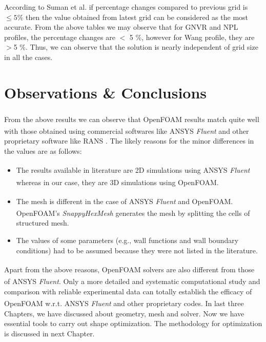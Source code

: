 According to Suman et al. \cite{suman} if percentage changes compared to previous grid is $\le 5 \%$ then the value obtained from latest grid can be considered as the most accurate. From the above tables we may observe that for GNVR and NPL profiles, the percentage changes are $<$  5 \%, however for Wang profile, they are $>$5 \%. Thus, we can observe that the solution is nearly independent of grid size in all the cases.

\section{Observations \& Conclusions}

From the above results we can observe that OpenFOAM\textsuperscript{\textregistered} results match quite well with those obtained using commercial softwares like ANSYS\textsuperscript{\textregistered} \textit{Fluent} and other proprietary software like RANS \cite{suman}. The likely reasons for the minor differences in the values are as follows:
\begin{itemize}
	\item The results available in literature are 2D simulations using ANSYS\textsuperscript{\textregistered} \textit{Fluent} whereas in our case, they are 3D simulations using OpenFOAM\textsuperscript{\textregistered}.
	\item The mesh is different in the case of ANSYS\textsuperscript{\textregistered} \textit{Fluent} and OpenFOAM\textsuperscript{\textregistered}. OpenFOAM\textsuperscript{\textregistered}'s \textit{SnappyHexMesh} generates the mesh by splitting the cells of structured mesh.
	\item The values of some parameters (e.g., wall functions and wall boundary conditions) had to be assumed because they were not listed in the literature.
\end{itemize}
Apart from the above reasons, OpenFOAM\textsuperscript{\textregistered} solvers are also different from those of ANSYS\textsuperscript{\textregistered} \textit{Fluent}. Only a more detailed and systematic computational study and comparison with reliable experimental data can totally establish the efficacy of OpenFOAM\textsuperscript{\textregistered} w.r.t. ANSYS\textsuperscript{\textregistered} \textit{Fluent} and other proprietary codes.
In last three Chapters, we have discussed about geometry, mesh and solver. Now we have essential tools to carry out shape optimization. The methodology for optimization is discussed in next Chapter.




